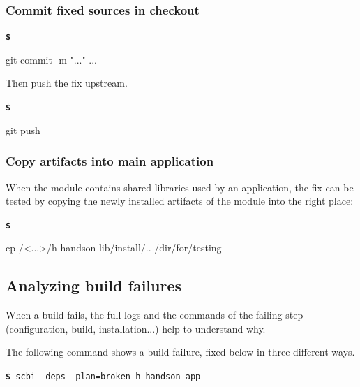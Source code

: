 \documentclass[a4paper,12pt,twoside]{article}
\newenvironment{shellcommand}{
	\begin{list}{ %
			\bfseries\texttt \$
		}{ %
			\ttfamily
			\setlength{\topsep}{-0.3ex}
			\setlength{\labelwidth}{1in}
			\setlength{\leftmargin}{0.7in}
			\setlength{\labelsep}{0.5ex}
			\setlength{\rightmargin}{0.5in}
			\setlength{\itemsep}{1ex}
			\setlength{\parsep}{0ex}
			\setlength{\listparindent}{0.5in}
		}
	}{
	\end{list}
}
\newcommand{\cmd}[1]{\tabto{1cm}\hspace{0.5cm}\texttt{\textbf{\$} #1}}
\begin{document}
\subsubsection{Commit fixed sources in checkout}

\begin{shellcommand}
	\item git commit -m "..." ...
\end{shellcommand}

Then push the fix upstream.

\begin{shellcommand}
	\item git push
\end{shellcommand}

\subsubsection{Copy artifacts into main application}

When the module contains shared libraries used by an application, the fix can be tested by copying the newly installed artifacts of the module into the right place:

\begin{shellcommand}
	\item cp /<...>/h-handson-lib/install/.. /dir/for/testing
\end{shellcommand}

\subsection{Analyzing build failures}
\label{debugging}

When a build fails, the full logs and the commands of the failing step (configuration, build, installation...) help to understand why.

The following command shows a build failure, fixed below in three different ways.

\cmd{scbi --deps --plan=broken h-handson-app}
\end{document}
